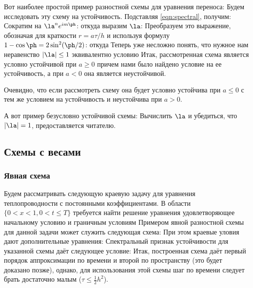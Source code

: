 \documentclass[a4paper]{article}
\begin{document}
\begin{ex}
Вот наиболее простой пример разностной схемы для уравнения переноса:
Будем исследовать эту схему на устойчивость. Подставляя
\eqref{eqn:spectral}, получим: 
Сократим на $\la^n e^{im\ph}$:
 откуда выразим $\la$:
Преобразуем это выражение, обозначая для краткости $r=a\tau/h$ и
используя формулу $1-\cos\ph=2\sin^2(\ph/2)$:
 откуда
Теперь уже несложно понять, что нужное нам неравенство $|\la|\le1$
эквивалентно условию 
Итак, рассмотренная схема является условно устойчивой при $a\ge0$
причем нами было найдено условие на ее устойчивость, а при $a<0$ она
является неустойчивой.
\end{ex}

\begin{note}
Очевидно, что если рассмотреть схему
 она
будет условно устойчива при $a\le0$ с тем же условием на устойчивость
и неустойчива при $a>0$.
\end{note}

А вот пример безусловно устойчивой схемы:
Вычислить $\la$ и убедиться, что $|\la|=1$, предоставляется читателю.

\subsection{Схемы с весами}

\subsubsection{Явная схема}

Будем рассматривать следующую краевую задачу для уравнения
теплопроводности с постоянными коэффициентами. В области
$\{0<x<1,0<t\le T\}$ требуется найти решение уравнения
 удовлетворяющее начальному условию
 и граничным условиям   Примером явной разностной схемы для данной задачи может
служить следующая схема:
При этом краевые уловия дают дополнительные уравнения:
  Спектральный признак
устойчивости для указанной схемы даёт следующее условие:
  Итак, построенная
схема даёт первый порядок аппроксимации по времени и второй по
пространству (это будет доказано позже), однако, для использования
этой схемы шаг по времени следует брать достаточно малым
($\tau\le\frac12h^2$).
\end{document}
